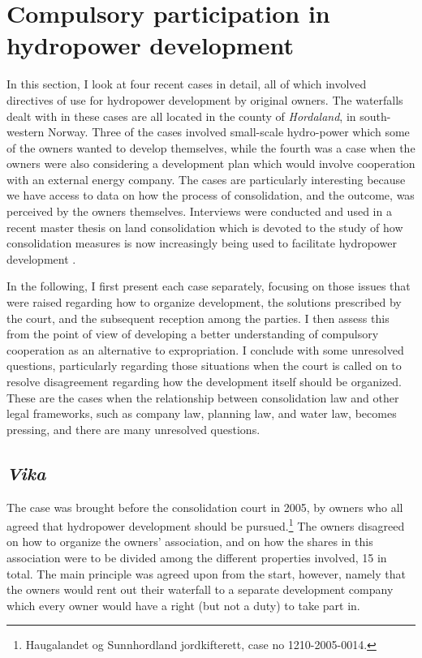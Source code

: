 \section{Compulsory participation in hydropower development}\label{sec:lch}

In this section, I look at four recent cases in detail, all of which involved directives of use for hydropower development by original owners. The waterfalls dealt with in these cases are all located in the county of \emph{Hordaland}, in south-western Norway. Three of the cases involved small-scale hydro-power which some of the owners wanted to develop themselves, while the fourth was a case when the owners were also considering a development plan which would involve cooperation with an external energy company. The cases are particularly interesting because we have access to data on how the process of consolidation, and the outcome, was perceived by the owners themselves. Interviews were conducted and used in a recent master thesis on land consolidation which is devoted to the study of how consolidation measures is now increasingly being used to facilitate hydropower development \cite{master}.

In the following, I first present each case separately, focusing on those issues that were raised regarding how to organize development, the solutions prescribed by the court, and the subsequent reception among the parties. I then assess this from the point of view of developing a better understanding of compulsory cooperation as an alternative to expropriation. I conclude with some unresolved questions, particularly regarding those situations when the court is called on to resolve disagreement regarding how the development itself should be organized. These are the cases when the relationship between consolidation law and other legal frameworks, such as company law, planning law, and water law, becomes pressing, and there are many unresolved questions.

\subsection{\emph{Vika}}

The case was brought before the consolidation court in 2005, by owners who all agreed that hydropower development should be pursued.\footnote{Haugalandet og Sunnhordland jordkifterett, case no 1210-2005-0014.} The owners disagreed on how to organize the owners' association, and on how the shares in this association were to be divided among the different properties involved, 15 in total. The main principle was agreed upon from the start, however, namely that the owners would rent out their waterfall to a separate development company which every owner would have a right (but not a duty) to take part in. 

